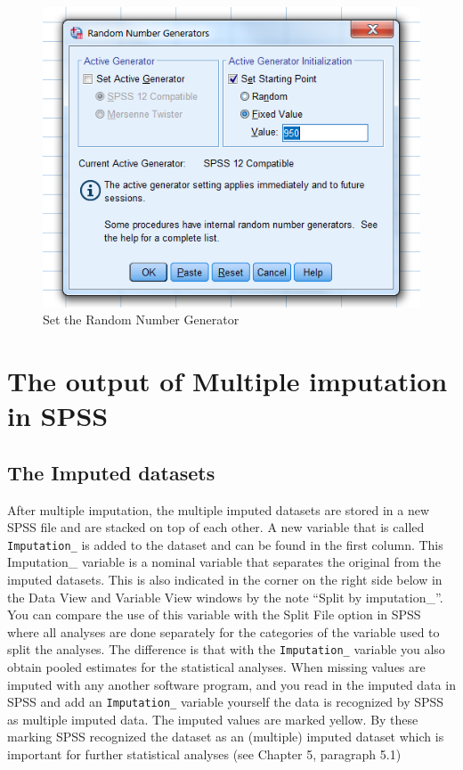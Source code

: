 \documentclass[
]{book}
\begin{document}
\begin{figure}

{\centering \includegraphics[width=0.7\linewidth]{images/fig4.5} 

}

\caption{Set the Random Number Generator }\label{fig:fig4-5}
\end{figure}

\hypertarget{the-output-of-multiple-imputation-in-spss}{%
\section{The output of Multiple imputation in SPSS}\label{the-output-of-multiple-imputation-in-spss}}

\hypertarget{the-imputed-datasets}{%
\subsection{The Imputed datasets}\label{the-imputed-datasets}}

After multiple imputation, the multiple imputed datasets are stored in a new SPSS file and are stacked on top of each other. A new variable that is called \texttt{Imputation\_} is added to the dataset and can be found in the first column. This Imputation\_ variable is a nominal variable that separates the original from the imputed datasets. This is also indicated in the corner on the right side below in the Data View and Variable View windows by the note ``Split by imputation\_''. You can compare the use of this variable with the Split File option in SPSS where all analyses are done separately for the categories of the variable used to split the analyses. The difference is that with the \texttt{Imputation\_} variable you also obtain pooled estimates for the statistical analyses. When missing values are imputed with any another software program, and you read in the imputed data in SPSS and add an \texttt{Imputation\_} variable yourself the data is recognized by SPSS as multiple imputed data. The imputed values are marked yellow. By these marking SPSS recognized the dataset as an (multiple) imputed dataset which is important for further statistical analyses (see Chapter 5, paragraph 5.1)
\end{document}
